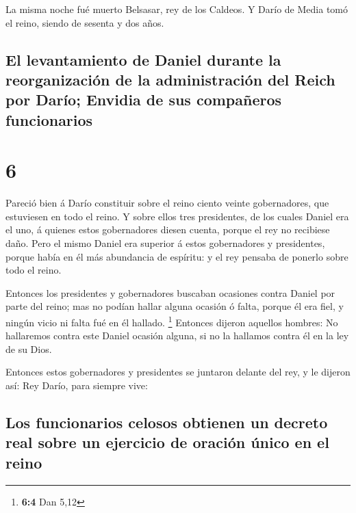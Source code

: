  La misma noche fué muerto Belsasar, rey de los Caldeos.
 Y Darío de Media tomó el reino, siendo de sesenta y dos
años.

\hypertarget{el-levantamiento-de-daniel-durante-la-reorganizaciuxf3n-de-la-administraciuxf3n-del-reich-por-daruxedo-envidia-de-sus-compauxf1eros-funcionarios}{%
\subsection{El levantamiento de Daniel durante la reorganización de la
administración del Reich por Darío; Envidia de sus compañeros
funcionarios}\label{el-levantamiento-de-daniel-durante-la-reorganizaciuxf3n-de-la-administraciuxf3n-del-reich-por-daruxedo-envidia-de-sus-compauxf1eros-funcionarios}}

\hypertarget{section-5}{%
\section{6}\label{section-5}}

 Pareció bien á Darío constituir sobre el reino ciento
veinte gobernadores, que estuviesen en todo el reino.  Y
sobre ellos tres presidentes, de los cuales Daniel era el uno, á quienes
estos gobernadores diesen cuenta, porque el rey no recibiese daño.
 Pero el mismo Daniel era superior á estos gobernadores y
presidentes, porque había en él más abundancia de espíritu: y el rey
pensaba de ponerlo sobre todo el reino.

 Entonces los presidentes y gobernadores buscaban ocasiones
contra Daniel por parte del reino; mas no podían hallar alguna ocasión ó
falta, porque él era fiel, y ningún vicio ni falta fué en él hallado.
\footnote{\textbf{6:4} Dan 5,12}  Entonces dijeron aquellos
hombres: No hallaremos contra este Daniel ocasión alguna, si no la
hallamos contra él en la ley de su Dios.

 Entonces estos gobernadores y presidentes se juntaron
delante del rey, y le dijeron así: Rey Darío, para siempre vive:

\hypertarget{los-funcionarios-celosos-obtienen-un-decreto-real-sobre-un-ejercicio-de-oraciuxf3n-uxfanico-en-el-reino}{%
\subsection{Los funcionarios celosos obtienen un decreto real sobre un
ejercicio de oración único en el
reino}\label{los-funcionarios-celosos-obtienen-un-decreto-real-sobre-un-ejercicio-de-oraciuxf3n-uxfanico-en-el-reino}}


